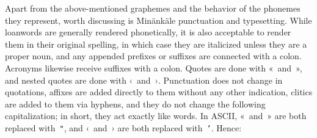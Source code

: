 Apart from the above-mentioned graphemes and the behavior of the phonemes they
represent, worth discussing is Min\"ank\"ale punctuation and typesetting. While
loanwords are generally rendered phonetically, it is also acceptable to render
them in their original spelling, in which case they are italicized unless they
are a proper noun, and any appended prefixes or suffixes are connected with a
colon. Acronyms likewise receive suffixes with a colon. Quotes are done with
«~and~», and nested quotes are done with ‹~and~›. Punctuation does not change in
quotations, affixes are added directly to them without any other indication,
clitics are added to them via hyphens, and they do not change the following
capitalization; in short, they act exactly like words. In ASCII, «~and~» are
both replaced with~\texttt{"}, and ‹~and~› are both replaced with~\texttt{'}.
Hence: 
